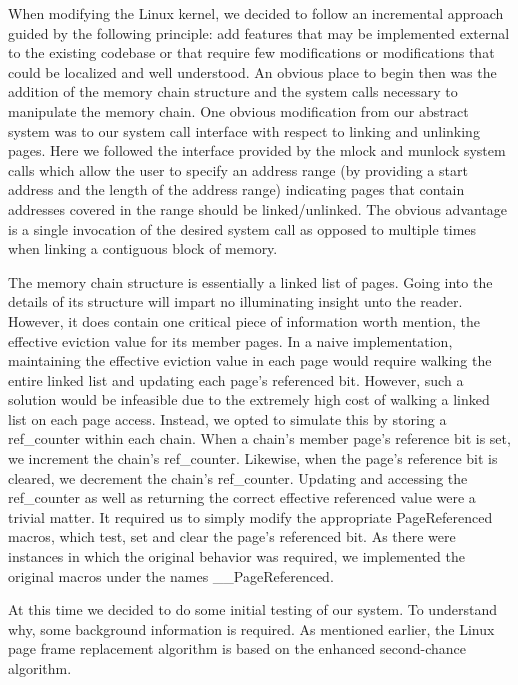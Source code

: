 \documentclass[10pt,a4paper,twocolumn]{article}
\begin{document}
When modifying the Linux kernel, we decided to follow an incremental approach guided by the
following principle: add features that may be implemented external to the existing codebase or that
require few modifications or modifications that could be localized and well understood.  An obvious
place to begin then was the addition of the memory chain structure and the system calls necessary to
manipulate the memory chain. One obvious modification from our abstract system was to our system
call interface with respect to linking and unlinking pages.  Here we followed the interface provided
by the mlock and munlock system calls which allow the user to specify an address range (by providing
a start address and the length of the address range) indicating pages that contain addresses covered
in the range should be linked/unlinked. The obvious advantage is a single invocation of the desired
system call as opposed to multiple times when linking a contiguous block of memory. 

The memory chain structure is essentially a linked list of pages. Going into the details of its
structure will impart no illuminating insight unto the reader. However, it does contain one critical
piece of information worth mention, the effective eviction value for its member pages. In a naive
implementation, maintaining the effective eviction value in each page would require walking the
entire linked list and updating each page's referenced bit. However, such a solution would be
infeasible due to the extremely high cost of walking a linked list on each page access. Instead, we
opted to simulate this by storing a ref\_counter within each chain. When a chain's member page's
reference bit is set, we increment the chain's ref\_counter. Likewise, when the page's reference bit
is cleared, we decrement the chain's ref\_counter. Updating and accessing the ref\_counter as well
as returning the correct effective referenced value were a trivial matter. It required us to simply
modify the appropriate PageReferenced macros, which test, set and clear the page's referenced bit.
As there were instances in which the original behavior was required, we implemented the original
macros under the names \_\_PageReferenced.

At this time we decided to do some initial testing of our system. To understand why, some background
information is required. As mentioned earlier, the Linux page frame replacement algorithm is based
on the enhanced second-chance algorithm.
 
\end{document}
